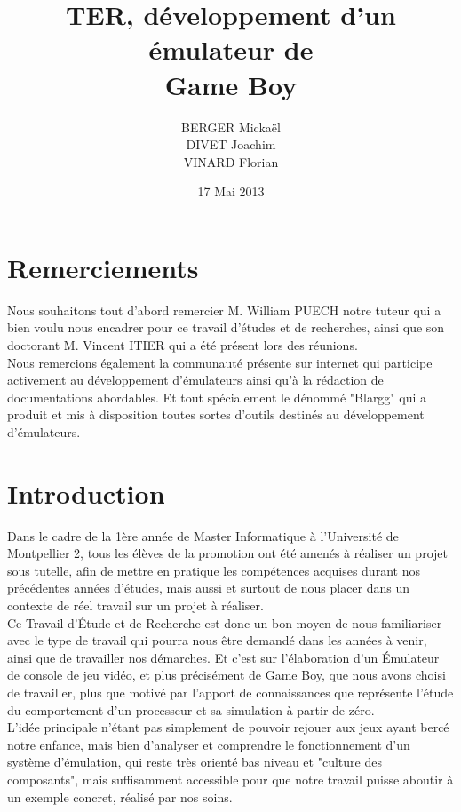 \documentclass{report}
\title{TER, développement d'un émulateur de \\Game Boy}
\author{BERGER Mickaël \\ DIVET Joachim \\ VINARD Florian}
\date{17 Mai 2013}
\begin{document}
\maketitle
\chapter*{Remerciements}
Nous souhaitons tout d'abord remercier M. William PUECH notre tuteur qui a bien voulu nous encadrer pour ce travail d'études et de recherches, ainsi que son doctorant M. Vincent ITIER qui a été présent lors des réunions. \\Nous remercions également la communauté présente sur internet qui participe activement au développement d'émulateurs ainsi qu'à la rédaction de documentations abordables. Et tout spécialement le dénommé "Blargg" qui a produit et mis à disposition toutes sortes d'outils destinés au développement d'émulateurs.

\tableofcontents
\listoffigures

\chapter*{Introduction}
	Dans le cadre de la 1ère année de Master Informatique à l'Université de Montpellier
	2, tous les élèves de la promotion ont été amenés à réaliser un projet
	sous tutelle, afin de mettre en pratique les compétences acquises
	durant nos précédentes années d'études, mais aussi et surtout de nous
	placer dans un contexte de réel travail sur un projet à réaliser.\\
	Ce Travail d'Étude et de Recherche est donc un bon moyen de nous
	familiariser avec le type de travail qui pourra nous être demandé dans
	les années à venir, ainsi que de travailler nos démarches.
	Et c'est sur l'élaboration d'un Émulateur de console de jeu vidéo, et plus précisément de Game Boy,
	que nous avons choisi de travailler, plus que motivé par l'apport de
	connaissances que représente l'étude du comportement d'un processeur
	et sa simulation à partir de zéro.
	\\
	L'idée principale n'étant pas simplement de pouvoir rejouer aux jeux
	ayant bercé notre enfance, mais bien d'analyser et comprendre le
	fonctionnement d'un système d'émulation, qui reste très orienté bas
	niveau et "culture des composants", mais suffisamment accessible pour
	que notre travail puisse aboutir à un exemple concret, réalisé par nos
	soins.\\
	\\
\end{document}
